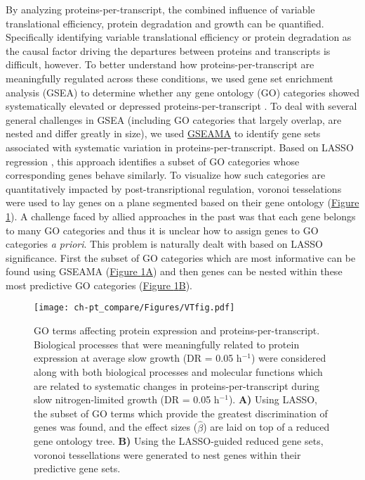 By analyzing proteins-per-transcript, the combined influence of variable translational efficiency, protein degradation and growth can be quantified. Specifically identifying variable translational efficiency or protein degradation as the causal factor driving the departures between proteins and transcripts is difficult, however. To better understand how proteins-per-transcript are meaningfully regulated across these conditions, we used gene set enrichment analysis (GSEA) to determine whether any gene ontology (GO) categories showed systematically elevated or depressed proteins-per-transcript \cite{Subramanian:2005jt}. To deal with several general challenges in GSEA (including GO categories that largely overlap, are nested and differ greatly in size), we used \href{https://github.com/dgrtwo/GSEAMA}{GSEAMA} to identify gene sets associated with systematic variation in proteins-per-transcript. Based on LASSO regression \cite{Tibshirani:1996wb}, this approach identifies a subset of GO categories whose corresponding genes behave similarly. To visualize how such categories are quantitatively impacted by post-transriptional regulation, voronoi tesselations \cite{Aurenhammer:1991ca} were used to lay genes on a plane segmented based on their gene ontology (\hyperref[voronoiFig]{Figure \ref{voronoiFig}}). A challenge faced by allied approaches in the past \cite{Halligan:2007ds, Otto:2010br} was that each gene belongs to many GO categories and thus it is unclear how to assign genes to GO categories \textit{a priori}. This problem is naturally dealt with based on LASSO significance. First the subset of GO categories which are most informative can be found using GSEAMA (\hyperref[voronoiFig]{Figure \ref{voronoiFig}A}) and then genes can be nested within these most predictive GO categories (\hyperref[voronoiFig]{Figure \ref{voronoiFig}B}).

\begin{figure}[hbtp]
\begin{center}
\texttt{[image: ch-pt\_compare/Figures/VTfig.pdf]}
\end{center}
\caption[GO terms affecting protein expression and proteins-per-transcript]{GO terms affecting protein expression and proteins-per-transcript. Biological processes that were meaningfully related to protein expression at average slow growth (DR = 0.05 h$^{-1}$) were considered along with both biological processes and molecular functions which are related to systematic changes in proteins-per-transcript during slow nitrogen-limited growth (DR = 0.05 h$^{-1}$). \textbf{A)} Using LASSO, the subset of GO terms which provide the greatest discrimination of genes was found, and the effect sizes ($\hat{\beta}$) are laid on top of a reduced gene ontology tree. \textbf{B)} Using the LASSO-guided reduced gene sets, voronoi tessellations were generated to nest genes within their predictive gene sets.}
\label{voronoiFig}
\end{figure}

